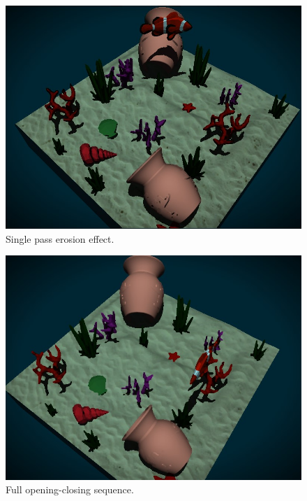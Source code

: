 \documentclass{article}
\begin{document}
\begin{figure}[h]
    \centering
    \includegraphics[width=\columnwidth]{imgs/erosion.jpg}
    \caption{Single pass erosion effect.}
    \label{fig:erosion_ms}
\end{figure}

\newpage

\begin{figure}[h]
    \vspace{1cm}
    \centering
    \includegraphics[width=\columnwidth]{imgs/opening_closing.jpg}
    \caption{Full opening-closing sequence.}
    \label{fig:opening_closing_ms}
\end{figure}

\vspace{5em}
\end{document}
